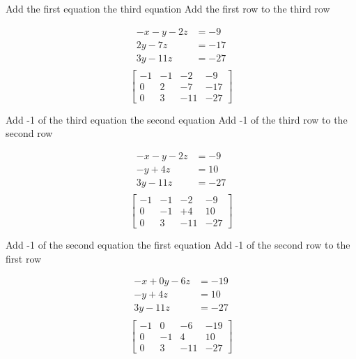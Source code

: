 \documentclass[a4paper, 12pt]{article}
\begin{document}
\begin{multicols}{2} 
Add the first equation the third equation
\break
Add the first row to the third row
\end{multicols}

\begin{multicols}{2}
\begin{align*}
-x  -y - 2z &= -9 \\
2y - 7z &= -17 \\
3y - 11z  &= -27\\
\end{align*}
\break
\[ \left[ {\begin{array}{cccc}
-1 & -1 & -2 & -9 \\
0 & 2 & -7 & -17 \\
0 & 3 & -11 & -27 
\end{array}} \right] \]
\end{multicols} 

\begin{multicols}{2} 
Add -1 of the third equation the second equation
\break
Add -1 of the third row to the second row
\end{multicols} 

\begin{multicols}{2}
\begin{align*}
-x  -y - 2z &= -9 \\
-y + 4z &= 10 \\
3y - 11z  &= -27\\
\end{align*}
\break
\[ \left[ {\begin{array}{cccc}
-1 & -1 & -2 & -9 \\
0 & -1 & +4 & 10 \\
0 & 3 & -11 & -27 
\end{array}} \right] \]
\end{multicols} 

\begin{multicols}{2} 
Add -1 of the second equation the first equation
\break
Add -1 of the second row to the first row
\end{multicols} 

\begin{multicols}{2}
\begin{align*}
-x +  0y  - 6z &= -19 \\
-y + 4z &= 10 \\
3y - 11z  &= -27\\
\end{align*}
\break
\[ \left[ {\begin{array}{cccc}
-1 & 0 & -6 & -19 \\
0 & -1 & 4 & 10 \\
0 & 3 & -11 & -27 
\end{array}} \right] \]
\end{multicols} 
\end{document}
